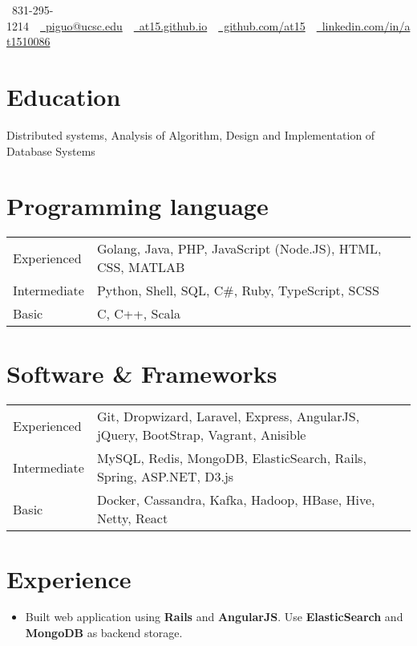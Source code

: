 \documentclass[10pt, letterpaper]{simple-cv}
\begin{document}
\centerline{\faMobile\ 831-295-1214\ \
\href{mailto:piguo@ucsc.edu}{\faEnvelope\ piguo@ucsc.edu}\ \
\href{https://at15.github.io}{\faHome\ at15.github.io}\ \
\href{https://github.com/at15}{\faGithubSquare\ github.com/at15}\ \
\href{https://www.linkedin.com/in/at1510086}{\faLinkedinSquare\ linkedin.com/in/at1510086}}

\section{Education}
Distributed systems, Analysis of Algorithm, Design and Implementation of Database Systems

\section{Programming language}
\begin{tabular}{ l l }
 Experienced &  Golang, Java, PHP, JavaScript (Node.JS), HTML, CSS, MATLAB \\
 Intermediate & Python, Shell, SQL, C\#, Ruby, TypeScript, SCSS \\
 Basic & C, C++, Scala
\end{tabular}

\section{Software \& Frameworks}
\begin{tabular}{ l l }
 Experienced & Git, Dropwizard, Laravel, Express, AngularJS, jQuery, BootStrap, Vagrant, Anisible\\
 Intermediate & MySQL, Redis, MongoDB, ElasticSearch, Rails, Spring, ASP.NET, D3.js \\
 Basic & Docker, Cassandra, Kafka, Hadoop, HBase, Hive, Netty, React
\end{tabular}

\section{Experience}

\begin{itemize}
\item Built web application using \textbf{Rails} and \textbf{AngularJS}. Use \textbf{ElasticSearch} and \textbf{MongoDB} as backend storage.
\end{itemize}
\end{document}
